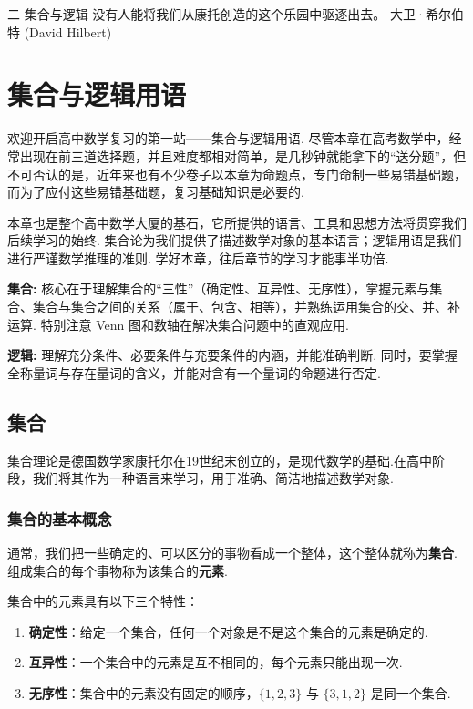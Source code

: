 	\makechapteropener
	{二}
	{集合与逻辑}
	{没有人能将我们从康托创造的这个乐园中驱逐出去。} 
	{大卫·希尔伯特 (David Hilbert)} 
	
	\chapter{集合与逻辑用语}

	\lettrine{欢}{迎开启}高中数学复习的第一站——集合与逻辑用语. 尽管本章在高考数学中，经常出现在前三道选择题，并且难度都相对简单，是几秒钟就能拿下的“送分题”，但不可否认的是，近年来也有不少卷子以本章为命题点，专门命制一些易错基础题，而为了应付这些易错基础题，复习基础知识是必要的.
	
	本章也是整个高中数学大厦的基石，它所提供的语言、工具和思想方法将贯穿我们后续学习的始终. 集合论为我们提供了描述数学对象的基本语言；逻辑用语是我们进行严谨数学推理的准则. 学好本章，往后章节的学习才能事半功倍.

\begin{introduction}[知识概括]
	\item \textbf{集合:} 核心在于理解集合的“三性”（确定性、互异性、无序性），掌握元素与集合、集合与集合之间的关系（属于、包含、相等），并熟练运用集合的交、并、补运算. 特别注意 Venn 图和数轴在解决集合问题中的直观应用.
	\item \textbf{逻辑:} 理解充分条件、必要条件与充要条件的内涵，并能准确判断. 同时，要掌握全称量词与存在量词的含义，并能对含有一个量词的命题进行否定.
\end{introduction}
	
	\section{集合}
	
	集合理论是德国数学家康托尔在19世纪末创立的，是现代数学的基础.在高中阶段，我们将其作为一种语言来学习，用于准确、简洁地描述数学对象.
	
	\subsection{集合的基本概念}
	
	\begin{definition}[集合] \label{def:set}
		通常，我们把一些确定的、可以区分的事物看成一个整体，这个整体就称为\textbf{集合}.组成集合的每个事物称为该集合的\textbf{元素}.
	\end{definition}
	
	\begin{note}
		集合中的元素具有以下三个特性：
		\begin{enumerate}
			\item \textbf{确定性}：给定一个集合，任何一个对象是不是这个集合的元素是确定的.
			\item \textbf{互异性}：一个集合中的元素是互不相同的，每个元素只能出现一次.
			\item \textbf{无序性}：集合中的元素没有固定的顺序，$\{1, 2, 3\}$ 与 $\{3, 1, 2\}$ 是同一个集合.
		\end{enumerate}
	\end{note}
	
